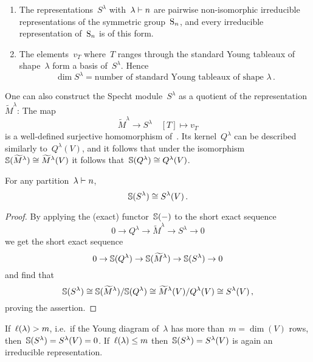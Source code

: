 \documentclass[a4paper,10pt]{scrartcl}
\begin{document}
\begin{theorem}
  \label{irreps of sn}
  \leavevmode
  \begin{enumerate}
    \item
      The representations~$S^\lambda$ with~$\lambda \vdash n$ are pairwise non-isomorphic irreducible representations of the symmetric group~$\operatorname{S}_n$, and every irreducible representation of~$\operatorname{S}_n$ is of this form.
    \item
      The elements~$v_T$ where~$T$ ranges through the standard Young tableaux of shape~$\lambda$ form a basis of~$S^\lambda$.
      Hence
      \[
        \dim S^\lambda
        =
        \text{number of standard Young tableaux of shape~$\lambda$} \,.
      \]
  \end{enumerate}
\end{theorem}

One can also construct the Specht module~$S^{\lambda}$ as a quotient of the representation~$\widetilde{M}^\lambda$:
The map
\[
  \widetilde{M}^\lambda
  \to
  S^\lambda
  \quad
  [T]
  \mapsto
  v_T
\]
is a well-defined surjective homomorphism of~{}.
Its kernel~$Q^\lambda$ can be described similarly to~$Q^\lambda(V)$, and it follows that under the isomorphism~$\mathbb{S}(\widetilde{M}^\lambda) \cong \widetilde{M}^\lambda(V)$ it follows that~$\mathbb{S}(Q^\lambda) \cong Q^{\lambda}(V)$.

\begin{theorem}
  For any partition~$\lambda \vdash n$,
  \[
    \mathbb{S}(S^\lambda) \cong S^{\lambda}(V) \,.
  \]
\end{theorem}

\begin{proof}
  By applying the (exact) functor~$\mathbb{S}(-)$ to the short exact sequence
  \[
    0
    \to
    Q^\lambda
    \to
    \widetilde{M}^\lambda
    \to
    S^\lambda
    \to
    0
  \]
  we get the short exact sequence
  \[
    0
    \to
    \mathbb{S}(Q^\lambda)
    \to
    \mathbb{S}(\widetilde{M}^\lambda)
    \to
    \mathbb{S}(S^\lambda)
    \to
    0
  \]
  and find that
  \[
    \mathbb{S}(S^\lambda)
    \cong
    \mathbb{S}(\widetilde{M}^\lambda)/\mathbb{S}(Q^\lambda)
    \cong
    \widetilde{M}^{\lambda}(V)/Q^{\lambda}(V)
    \cong
    S^{\lambda}(V) \,,
  \]
  proving the assertion.
\end{proof}


\begin{remark}
  \label{kernel of schur functor}
  If~$\operatorname{\ell}(\lambda) > m$, i.e.\ if the Young diagram of~$\lambda$ has more than~$m = \dim(V)$ rows, then~$\mathbb{S}(S^\lambda) = S^\lambda(V) = 0$.
  If~$\operatorname{\ell}(\lambda) \leq m$ then~$\mathbb{S}(S^\lambda) = S^\lambda(V)$ is again an irreducible representation.
\end{remark}
\end{document}
